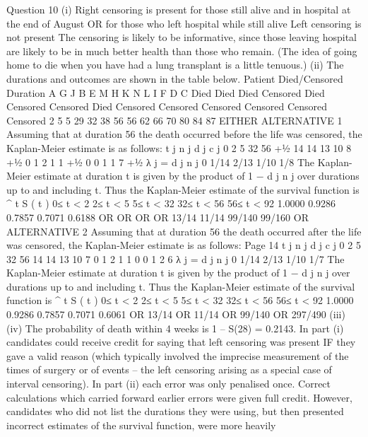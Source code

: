 \documentclass[a4paper,12pt]{article}
\begin{document}
\newpage
Question 10
(i)
Right censoring is present
for those still alive and in hospital at the end of August
OR
for those who left hospital while still alive
Left censoring is not present
The censoring is likely to be informative, since those leaving hospital are
likely to be in much better health than those who remain. (The idea of going home to
die when you have had a lung transplant is a little tenuous.)
(ii)
The durations and outcomes are shown in the table below.
Patient Died/Censored Duration
A
G
J
B
E
M
H
K
N
L
I
F
D
C Died
Died
Died
Censored
Died
Censored
Censored
Died
Censored
Censored
Censored
Censored
Censored
Censored 2
5
5
29
32
38
56
56
62
66
70
80
84
87
EITHER ALTERNATIVE 1
Assuming that at duration 56 the death occurred before the life was censored, the
Kaplan-Meier estimate is as follows:
t j n j d j c j
0
2
5
32
56
+1⁄2 14
14
13
10
8
+1⁄2 0
1
2
1
1
+1⁄2 0
0
1
1
7
+1⁄2
λ j =
d j
n j
0
1/14
2/13
1/10
1/8
The Kaplan-Meier estimate at duration t is given by the product of 1 −
d j
n j
over
durations up to and including t. Thus the Kaplan-Meier estimate of the survival
function is
^
t S ( t )
0≤ t < 2
2≤ t < 5
5≤ t < 32
32≤ t < 56
56≤ t < 92 1.0000
0.9286
0.7857
0.7071
0.6188
OR
OR
OR
OR
13/14
11/14
99/140
99/160
OR ALTERNATIVE 2
Assuming that at duration 56 the death occurred after the life was
censored, the Kaplan-Meier estimate is as follows:
Page 14
t j n j d j c j
0
2
5
32
56 14
14
13
10
7 0
1
2
1
1 0
0
1
2
6
λ j =
d j
n j
0
1/14
2/13
1/10
1/7
The Kaplan-Meier estimate at duration t is given by the product of 1 −
d j
n j
over
durations up to and including t. Thus the Kaplan-Meier estimate of the survival
function is
^
t S ( t )
0≤ t < 2
2≤ t < 5
5≤ t < 32
32≤ t < 56
56≤ t < 92 1.0000
0.9286
0.7857
0.7071
0.6061
OR 13/14
OR 11/14
OR 99/140
OR 297/490
(iii)
(iv)
The probability of death within 4 weeks is 1 – S(28) = 0.2143.
In part (i) candidates could receive credit for saying that left censoring was present IF they gave a valid reason (which typically involved the imprecise measurement of the times of
surgery or of events – the left censoring arising as a special case of interval censoring).
In part (ii) each error was only penalised once. Correct calculations which carried forward earlier errors were given full credit. However, candidates who did not list the durations they
were using, but then presented incorrect estimates of the survival function, were more heavily
\end{document}
